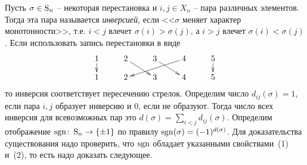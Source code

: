 Пусть $\sigma \in\operatorname{S}_{n}$ -- некоторая перестановка и $i,j\in X_n$ -- пара различных элементов.
Тогда эта пара называется {\it инверсией}, если <<$\sigma$ меняет характер монотонности>>, т.е. $i<j$ влечет $\sigma(i)>\sigma(j)$, а $i>j$ влечет $\sigma(i)<\sigma(j)$.
Если использовать запись перестановки в виде
\[
\xymatrix@R=10pt{
	{1}\ar[d]&{2}\ar[dr]&{3}\ar[dr]&{4}\ar[dll]&{5}\ar[d]\\
	{1}&{2}&{3}&{4}&{5}
}
\]
то инверсия соответствует пересечению стрелок.
Определим число $d_{ij}(\sigma) = 1$, если пара $i, j$ образует инверсию и $0$, если не образуют.
Тогда число всех инверсия для всевозможных пар это $d(\sigma) = \sum_{i < j} d_{ij}(\sigma)$.
Определим отображение $\operatorname{sgn}\colon \operatorname{S}_{n}\to \{\pm 1\}$ по правилу $\operatorname{sgn}(\sigma) = (-1)^{d(\sigma)}$.
Для доказательства существования надо проверить, что $\operatorname{sgn}$ обладает указанными свойствами~(1) и~(2), то есть надо доказать следующее.

